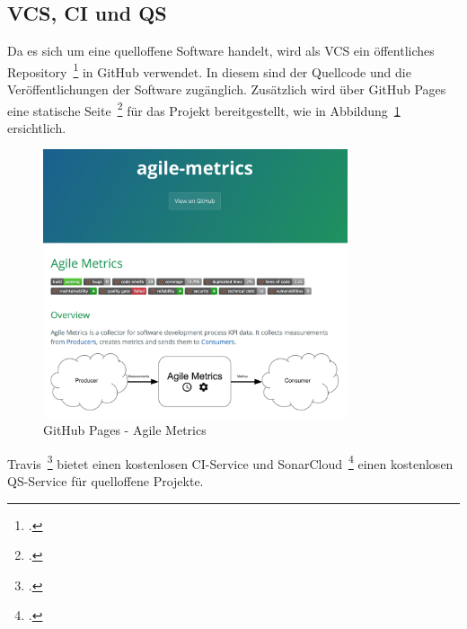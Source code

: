 \subsection{\ac{VCS}, \ac{CI} und \ac{QS}}

Da es sich um eine quelloffene Software handelt, wird als \ac{VCS} ein öffentliches Repository~\footcite{agile_metrics_repo} in GitHub verwendet.
In diesem sind der Quellcode und die Veröffentlichungen der Software zugänglich.
Zusätzlich wird über GitHub Pages eine statische Seite~\footcite{agile_metrics_page} für das Projekt bereitgestellt, wie in Abbildung~\ref{fig:github_pages} ersichtlich.

\begin{savenotes}
    \begin{figure}[H] 
        \centering
            \includegraphics[width=0.8\textwidth]{img/github-pages.png}
        \caption{GitHub Pages - Agile Metrics}\label{fig:github_pages}
    \end{figure}
\end{savenotes}

Travis~\footcite{travis_agile_metrics} bietet einen kostenlosen \ac{CI}-Service und SonarCloud~\footcite{sonarcloud_agile_metrics} einen kostenlosen \ac{QS}-Service für quelloffene Projekte.

